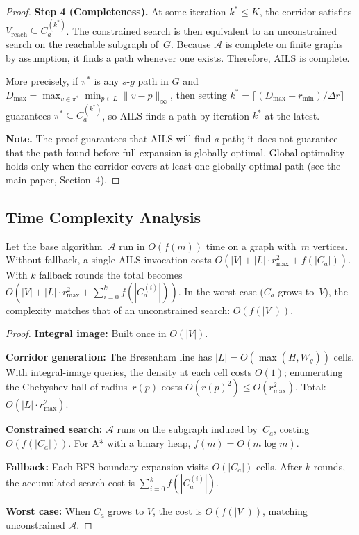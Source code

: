 \documentclass[11pt]{article}
\begin{document}
\begin{proof}
\textbf{Step 4 (Completeness).}
At some iteration $k^{*} \leq K$, the corridor satisfies $V_{\mathrm{reach}} \subseteq C_a^{(k^{*})}$.
The constrained search is then equivalent to an unconstrained search on the reachable subgraph of~$G$.
Because $\mathcal{A}$ is complete on finite graphs by assumption, it finds a path whenever one exists.
Therefore, AILS is complete.

More precisely, if $\pi^{*}$ is any $s$-$g$ path in $G$ and $D_{\max} = \max_{v \in \pi^{*}} \min_{p \in L}\|v-p\|_{\infty}$, then setting $k^{*} = \lceil (D_{\max} - r_{\min}) / \Delta r \rceil$ guarantees $\pi^{*} \subseteq C_a^{(k^{*})}$, so AILS finds a path by iteration $k^{*}$ at the latest.

\textbf{Note.} The proof guarantees that AILS will find \emph{a} path; it does not guarantee that the path found before full expansion is globally optimal.
Global optimality holds only when the corridor covers at least one globally optimal path (see the main paper, Section~4).
\end{proof}

\subsection{Time Complexity Analysis}

\begin{theorem}
Let the base algorithm~$\mathcal{A}$ run in $O(f(m))$ time on a graph with~$m$ vertices.
Without fallback, a single AILS invocation costs
$O(|V| + |L| \cdot r_{\max}^{2} + f(|C_a|))$.
With $k$ fallback rounds the total becomes
$O(|V| + |L| \cdot r_{\max}^{2} + \sum_{i=0}^{k} f(|C_a^{(i)}|))$.
In the worst case ($C_a$ grows to~$V$), the complexity matches that of an unconstrained search: $O(f(|V|))$.
\end{theorem}

\begin{proof}
\textbf{Integral image:} Built once in $O(|V|)$.

\textbf{Corridor generation:} The Bresenham line has $|L| = O(\max(H, W_g))$ cells.
With integral-image queries, the density at each cell costs $O(1)$; enumerating the Chebyshev ball of radius~$r(p)$ costs $O(r(p)^{2}) \leq O(r_{\max}^{2})$.
Total: $O(|L| \cdot r_{\max}^{2})$.

\textbf{Constrained search:} $\mathcal{A}$ runs on the subgraph induced by~$C_a$, costing $O(f(|C_a|))$.
For A* with a binary heap, $f(m) = O(m \log m)$.

\textbf{Fallback:} Each BFS boundary expansion visits $O(|C_a|)$ cells.
After $k$ rounds, the accumulated search cost is $\sum_{i=0}^{k} f(|C_a^{(i)}|)$.

\textbf{Worst case:} When $C_a$ grows to $V$, the cost is $O(f(|V|))$, matching unconstrained $\mathcal{A}$.
\end{proof}
\end{document}
